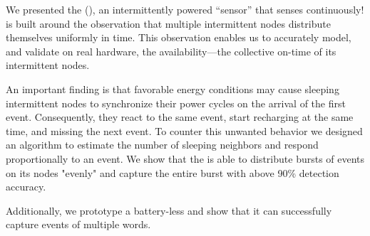 We presented the \textit{\fullcis} (\cis), an intermittently powered ``sensor'' that senses continuously! \cis is built around the observation that multiple intermittent nodes distribute themselves uniformly in time. This observation enables us to accurately model, and validate on real hardware, the \cis availability---the collective on-time of its intermittent nodes. 

An important finding is that favorable energy conditions may cause sleeping intermittent nodes to synchronize their power cycles on the arrival of the first event. Consequently, they react to the same event, start recharging at the same time, and missing the next event. To counter this unwanted behavior we designed an algorithm to estimate the number of sleeping neighbors and respond proportionally to an event. We show that the \fullcis is able to distribute bursts of events on its nodes "evenly" and capture the entire burst with above 90\% detection accuracy.
 
Additionally, we prototype a battery-less \fullcim and show that it can successfully capture events of multiple words. 
